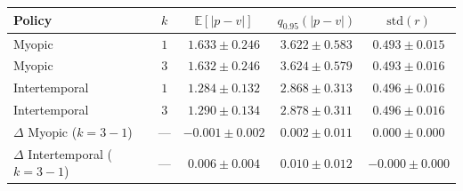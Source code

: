 \begin{tabular}{lcccc}
\hline
Policy & $k$ & $\mathbb{E}[|p-v|]$ & $q_{0.95}(|p-v|)$ & $\mathrm{std}(r)$ \\
\hline
Myopic & $1$ & $1.633\pm0.246$ & $3.622\pm0.583$ & $0.493\pm0.015$ \\
Myopic & $3$ & $1.632\pm0.246$ & $3.624\pm0.579$ & $0.493\pm0.016$ \\
Intertemporal & $1$ & $1.284\pm0.132$ & $2.868\pm0.313$ & $0.496\pm0.016$ \\
Intertemporal & $3$ & $1.290\pm0.134$ & $2.878\pm0.311$ & $0.496\pm0.016$ \\
$\Delta$ Myopic ($k=3-1$) & --- & $-0.001\pm0.002$ & $0.002\pm0.011$ & $0.000\pm0.000$ \\
$\Delta$ Intertemporal ($k=3-1$) & --- & $0.006\pm0.004$ & $0.010\pm0.012$ & $-0.000\pm0.000$ \\
\hline
\end{tabular}
